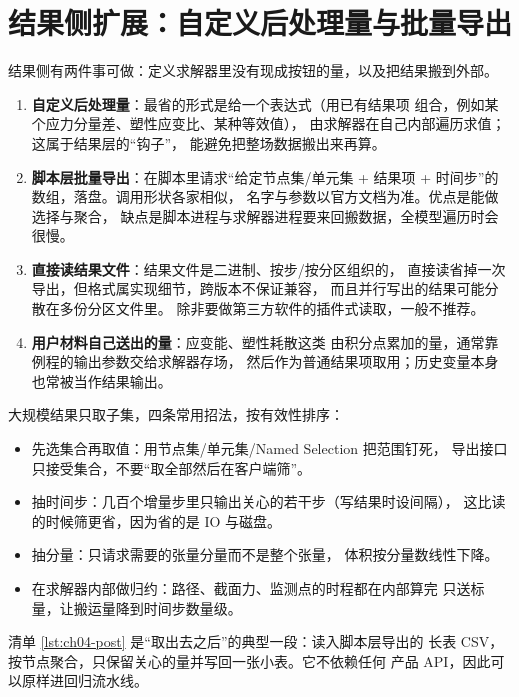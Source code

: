 \documentclass[12pt,a4paper,fontset=fandol]{ctexbook}
\begin{document}
\section{结果侧扩展：自定义后处理量与批量导出}
\label{sec:ch04-results}

结果侧有两件事可做：定义求解器里没有现成按钮的量，以及把结果搬到外部。

\begin{enumerate}
  \item \textbf{自定义后处理量}：最省的形式是给一个表达式（用已有结果项
        组合，例如某个应力分量差、塑性应变比、某种等效值），
        由求解器在自己内部遍历求值；这属于结果层的``钩子''，
        能避免把整场数据搬出来再算。
  \item \textbf{脚本层批量导出}：在脚本里请求``给定节点集/单元集 +
        结果项 + 时间步''的数组，落盘。调用形状各家相似，
        名字与参数以官方文档为准。优点是能做选择与聚合，
        缺点是脚本进程与求解器进程要来回搬数据，全模型遍历时会很慢。
  \item \textbf{直接读结果文件}：结果文件是二进制、按步/按分区组织的，
        直接读省掉一次导出，但格式属实现细节，跨版本不保证兼容，
        而且并行写出的结果可能分散在多份分区文件里。
        除非要做第三方软件的插件式读取，一般不推荐。
  \item \textbf{用户材料自己送出的量}：应变能、塑性耗散这类
        由积分点累加的量，通常靠例程的输出参数交给求解器存场，
        然后作为普通结果项取用；历史变量本身也常被当作结果输出。
\end{enumerate}

大规模结果只取子集，四条常用招法，按有效性排序：

\begin{itemize}
  \item 先选集合再取值：用节点集/单元集/Named Selection 把范围钉死，
        导出接口只接受集合，不要``取全部然后在客户端筛''。
  \item 抽时间步：几百个增量步里只输出关心的若干步（写结果时设间隔），
        这比读的时候筛更省，因为省的是 IO 与磁盘。
  \item 抽分量：只请求需要的张量分量而不是整个张量，
        体积按分量数线性下降。
  \item 在求解器内部做归约：路径、截面力、监测点的时程都在内部算完
        只送标量，让搬运量降到时间步数量级。
\end{itemize}

清单 \ref{lst:ch04-post} 是``取出去之后''的典型一段：读入脚本层导出的
长表 CSV，按节点聚合，只保留关心的量并写回一张小表。它不依赖任何
产品 API，因此可以原样进回归流水线。
\end{document}
